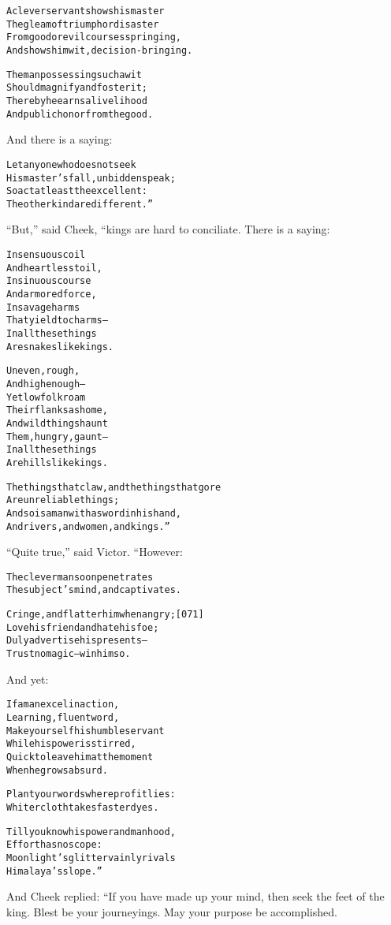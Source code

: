 \documentclass{article}
\renewenvironment{verbatim}{\begin{alltt}\normalfont\begin{centering}}{\end{centering}\end{alltt}}
\begin{document}
\begin{verbatim}
A clever servant shows his master
The gleam of triumph or disaster
From good or evil courses springing,
And shows him wit, decision-bringing.

The man possessing such a wit
Should magnify and foster it;
Thereby he earns a livelihood
And public honor from the good.
\end{verbatim}
And there is a saying:

\begin{verbatim}
Let anyone who does not seek
His master's fall, unbidden speak;
So act at least the excellent:
The other kind are different.”
\end{verbatim}
``But,'' said Cheek, “kings are hard to conciliate. There is a
saying:

\begin{verbatim}
In sensuous coil
And heartless toil,
In sinuous course
And armored force,
In savage harms
That yield to charms--
In all these things
Are snakes like kings.

Uneven, rough,
And high enough--
Yet low folk roam
Their flanks as home,
And wild things haunt
Them, hungry, gaunt--
In all these things
Are hills like kings.

The things that claw, and the things that gore
    Are unreliable things;
And so is a man with a sword in his hand,
    And rivers, and women, and kings.”
\end{verbatim}
``Quite true,'' said Victor. “However:

\begin{verbatim}
The clever man soon penetrates
The subject's mind, and captivates.

Cringe, and flatter him when angry;                     [071]
    Love his friend and hate his foe;
Duly advertise his presents--
    Trust no magic--win him so.
\end{verbatim}
And yet:

\begin{verbatim}
If a man excel in action,
    Learning, fluent word,
Make yourself his humble servant
    While his power is stirred,
Quick to leave him at the moment
    When he grows absurd.

Plant your words where profit lies:
Whiter cloth takes faster dyes.

Till you know his power and manhood,
    Effort has no scope:
Moonlight's glitter vainly rivals
    Himalaya's slope.”
\end{verbatim}
And Cheek replied: “If you have made up your mind, then seek the
feet of the king. Blest be your journeyings. May your purpose be
accomplished.
\end{document}
